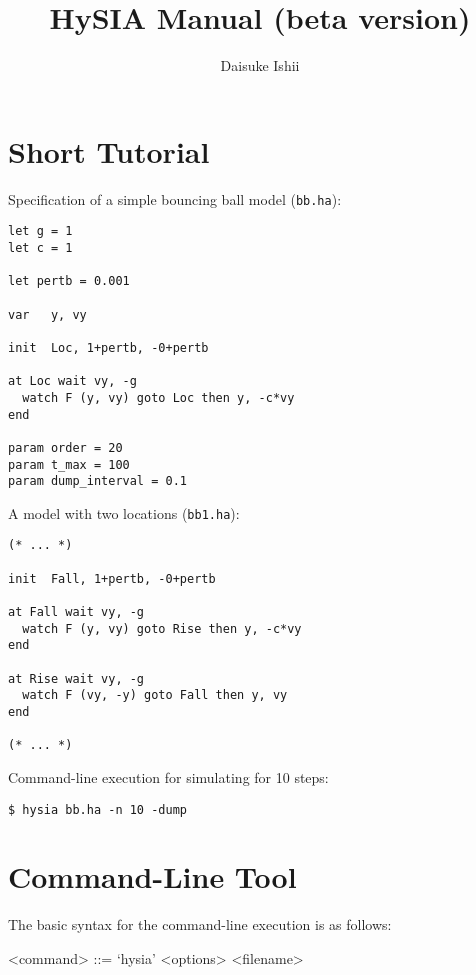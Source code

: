 \documentclass[10pt,a4paper]{article}
\begin{document}
\title{HySIA Manual (beta version)}
\author{Daisuke Ishii}

\maketitle

\setlength{\grammarparsep}{8pt plus 1pt minus 1pt} %
\setlength{\grammarindent}{8em} %

\section{Short Tutorial}

Specification of a simple bouncing ball model (\texttt{bb.ha}):
\begin{lstlisting}
let g = 1
let c = 1

let pertb = 0.001

var   y, vy

init  Loc, 1+pertb, -0+pertb

at Loc wait vy, -g
  watch F (y, vy) goto Loc then y, -c*vy
end

param order = 20
param t_max = 100
param dump_interval = 0.1
\end{lstlisting}

A model with two locations (\texttt{bb1.ha}):
\begin{lstlisting}
(* ... *)

init  Fall, 1+pertb, -0+pertb

at Fall wait vy, -g
  watch F (y, vy) goto Rise then y, -c*vy
end

at Rise wait vy, -g
  watch F (vy, -y) goto Fall then y, vy
end

(* ... *)
\end{lstlisting}

Command-line execution for simulating for 10 steps:
\begin{verbatim}
$ hysia bb.ha -n 10 -dump
\end{verbatim}


\section{Command-Line Tool}

The basic syntax for the command-line execution is as follows:
\begin{grammar}
<command> ::= `hysia' <options> <filename>
\end{grammar}
\end{document}
